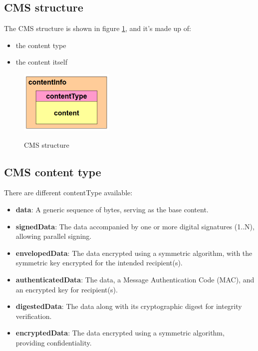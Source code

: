 \subsection{CMS structure}
The CMS structure is shown in figure \ref{fig:cms structure}, and it's
made up of:
\begin{itemize}
  \item the content type 
  \item the content itself 

\end{itemize}

\begin{figure}[H]
  \centering
  \includegraphics[width=0.4\textwidth]{img/cms structure.png}
  \label{fig:cms structure}
  \caption{CMS structure}
\end{figure}

\subsection{CMS content type}

There are different contentType available:

\begin{itemize}
    \item \textbf{data}: A generic sequence of bytes, serving as the
      base content.
    \item \textbf{signedData}: The data accompanied by one or more
      digital signatures (1..N), allowing parallel signing.
    \item \textbf{envelopedData}: The data encrypted using a symmetric
      algorithm, with the symmetric key encrypted for the intended
      recipient(s).
    \item \textbf{authenticatedData}: The data, a Message
      Authentication Code (MAC), and an encrypted key for
      recipient(s).
    \item \textbf{digestedData}: The data along with its cryptographic
      digest for integrity verification.
    \item \textbf{encryptedData}: The data encrypted using a symmetric
      algorithm, providing confidentiality.
\end{itemize}


